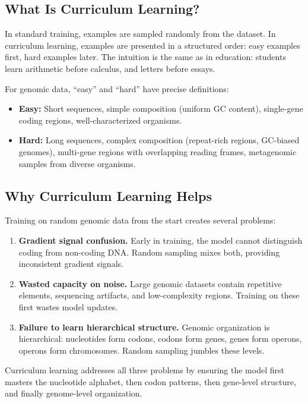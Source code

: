 \subsection{What Is Curriculum Learning?}

In standard training, examples are sampled randomly from the dataset. In curriculum learning, examples are presented in a structured order: easy examples first, hard examples later. The intuition is the same as in education: students learn arithmetic before calculus, and letters before essays.

For genomic data, ``easy'' and ``hard'' have precise definitions:

\begin{itemize}[leftmargin=1.5em]
  \item \textbf{Easy:} Short sequences, simple composition (uniform GC content), single-gene coding regions, well-characterized organisms.
  \item \textbf{Hard:} Long sequences, complex composition (repeat-rich regions, GC-biased genomes), multi-gene regions with overlapping reading frames, metagenomic samples from diverse organisms.
\end{itemize}

\subsection{Why Curriculum Learning Helps}

Training on random genomic data from the start creates several problems:

\begin{enumerate}[leftmargin=1.5em]
  \item \textbf{Gradient signal confusion.} Early in training, the model cannot distinguish coding from non-coding DNA. Random sampling mixes both, providing inconsistent gradient signals.
  \item \textbf{Wasted capacity on noise.} Large genomic datasets contain repetitive elements, sequencing artifacts, and low-complexity regions. Training on these first wastes model updates.
  \item \textbf{Failure to learn hierarchical structure.} Genomic organization is hierarchical: nucleotides form codons, codons form genes, genes form operons, operons form chromosomes. Random sampling jumbles these levels.
\end{enumerate}

Curriculum learning addresses all three problems by ensuring the model first masters the nucleotide alphabet, then codon patterns, then gene-level structure, and finally genome-level organization.

